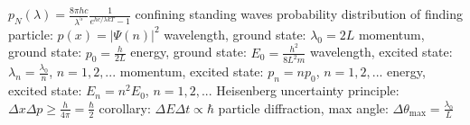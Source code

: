 \documentclass[10pt,landscape]{article}
\newcommand{\spc}{\hspace*{1em}}
\begin{document}
\begin{multicols*}{3}
\spc \spc $p_N(\lambda)=\frac{8\pi hc}{\lambda^5}\frac{1}{e^{hc/\lambda kT}-1}$
\newline \newline
confining standing waves
\newline
\spc probability distribution of finding particle: $p(x)=|\Psi(n)|^2$
\newline
\spc wavelength, ground state: $\lambda_0=2L$
\newline
\spc momentum, ground state: $p_0=\frac{h}{2L}$
\newline
\spc energy, ground state: $E_0=\frac{h^2}{8L^2m}$
\newline
\spc wavelength, excited state: $\lambda_n=\frac{\lambda_0}{n}$, $n=1,2,...$
\newline
\spc momentum, excited state: $p_n=np_0$, $n=1,2,...$
\newline
\spc energy, excited state: $E_n=n^2E_0$, $n=1,2,...$
\newline \newline
Heisenberg uncertainty principle: $\Delta x\Delta p\geq \frac{h}{4\pi}= \frac{\hbar}{2}$
\newline
\spc corollary: $\Delta E\Delta t\propto \hbar$
\newline
particle diffraction, max angle: $\Delta \theta_{\textrm{max}}=\frac{\lambda_0}{L}$

\end{multicols*}
\end{document}
